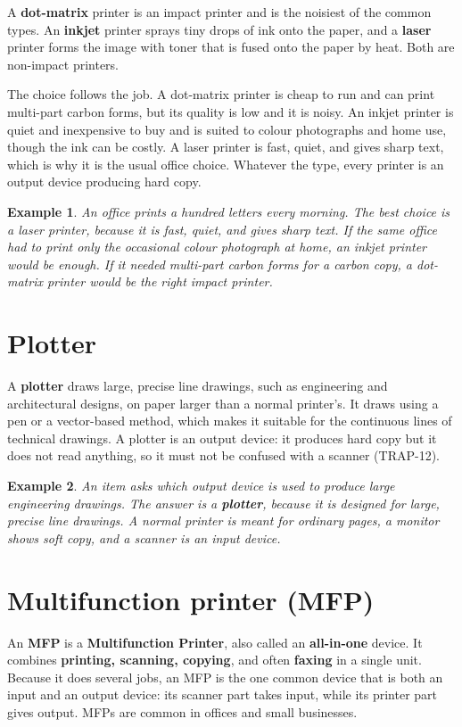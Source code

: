 \documentclass[11pt]{article}
\newtheorem{example}{Example}[section]
\begin{document}
A \textbf{dot-matrix} printer is an impact printer and is the noisiest of the
common types. An \textbf{inkjet} printer sprays tiny drops of ink onto the
paper, and a \textbf{laser} printer forms the image with toner that is fused
onto the paper by heat. Both are non-impact printers.

The choice follows the job. A dot-matrix printer is cheap to run and can print
multi-part carbon forms, but its quality is low and it is noisy. An inkjet
printer is quiet and inexpensive to buy and is suited to colour photographs
and home use, though the ink can be costly. A laser printer is fast, quiet,
and gives sharp text, which is why it is the usual office choice. Whatever the
type, every printer is an output device producing hard copy.

\begin{example}
An office prints a hundred letters every morning. The best choice is a laser
printer, because it is fast, quiet, and gives sharp text. If the same office
had to print only the occasional colour photograph at home, an inkjet printer
would be enough. If it needed multi-part carbon forms for a carbon copy, a
dot-matrix printer would be the right impact printer.
\end{example}

\section{Plotter}
A \textbf{plotter} draws large, precise line drawings, such as engineering and
architectural designs, on paper larger than a normal printer's. It draws using
a pen or a vector-based method, which makes it suitable for the continuous
lines of technical drawings. A plotter is an output device: it produces hard
copy but it does not read anything, so it must not be confused with a scanner
(TRAP-12).

\begin{example}
An item asks which output device is used to produce large engineering
drawings. The answer is a \textbf{plotter}, because it is designed for large,
precise line drawings. A normal printer is meant for ordinary pages, a monitor
shows soft copy, and a scanner is an input device.
\end{example}

\section{Multifunction printer (MFP)}
An \textbf{MFP} is a \textbf{Multifunction Printer}, also called an
\textbf{all-in-one} device. It combines \textbf{printing, scanning, copying},
and often \textbf{faxing} in a single unit. Because it does several jobs, an
MFP is the one common device that is both an input and an output device: its
scanner part takes input, while its printer part gives output. MFPs are common
in offices and small businesses.
\end{document}
